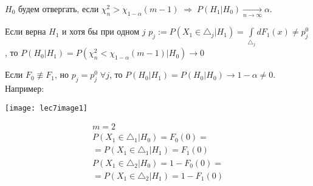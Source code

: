 \begin{rulee}\label{lec:7/rule:2}
	$H_0$ будем отвергать, если $\chi_n^2 > \chi_{1-\alpha} (m-1) \; \Rightarrow \; P(H_1 | H_0) \xrightarrow[n\to \infty]{}\alpha$.

	Если верна $H_1$ и хотя бы при одном $j$ $p_j := P(X_1 \in \triangle_j | H_1) = \underset{\triangle_j}{\overset{}{\int}}d F_1 (x) \not = p_j^0$, то $P(H_0 | H_1) = P(\chi_n^2 < \chi_{1-\alpha}(m-1)|H_0) \to 0$
\end{rulee}

\begin{remark}\label{lec:7/remark:1}
	Если $F_0 \not \equiv F_1$, но $p_j = p_j^0 \; \forall j$, то $P(H_0 | H_1) = P(H_0 | H_0) \to 1- \alpha \not = 0$. Например:
	\begin{multicols}{2}
			\texttt{[image: lec7image1]}

		\columnbreak
			$$\begin{gathered}
				m=2 \\
				P(X_1 \in \triangle_1 | H_0) = F_0 (0) = \\
				= P(X_1 \in \triangle_1 | H_1) = F_1(0) \\
				P(X_1 \in \triangle_2 | H_0) = 1 - F_0 (0) = \\
				=  P(X_1 \in \triangle_2 | H_1) = 1 - F_1(0)
			\end{gathered}$$
	\end{multicols}
\end{remark}

